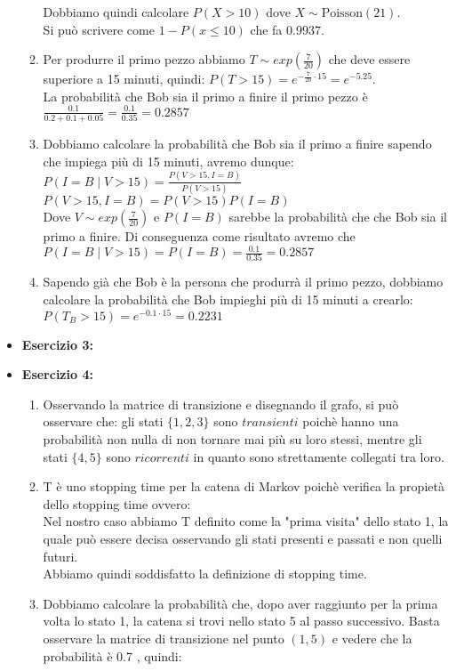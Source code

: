 \documentclass[a4paper,12pt]{article}
\begin{document}
\begin{itemize}
\begin{enumerate}[label=\alph*)]
			Dobbiamo quindi calcolare $P(X > 10)$ dove $X \sim \text{Poisson}(21)$.\\
			Si può scrivere come $1-P(x\leq10)$ che fa 0.9937.\\
			\item Per produrre il primo pezzo abbiamo $T\sim exp(\frac{7}{20})$ che deve essere superiore a 15 minuti, quindi: $P(T > 15)=e^{-\frac{7}{20}\cdot15}=e^{-5.25}.$\\
			La probabilità che Bob sia il primo a finire il primo pezzo è $\frac{0.1}{0.2+0.1+0.05}=\frac{0.1}{0.35}=0.2857$
			\item Dobbiamo calcolare la probabilità che Bob sia il primo a finire sapendo che impiega più di 15 minuti, avremo dunque:\\
			$P(I=B\mid V>15) = \frac{P(V > 15, I = B)}{P(V>15)}$\\
			$P(V > 15, I = B) = P(V > 15)P(I = B)$\\
			Dove $V\sim exp(\frac{7}{20})$ e $P(I=B)$ sarebbe la probabilità che che Bob sia il primo a finire. Di conseguenza come risultato avremo che $P(I=B\mid V>15) =P(I = B)=\frac{0.1}{0.35}=0.2857$
			\item Sapendo già che Bob è la persona che produrrà il primo pezzo, dobbiamo calcolare la probabilità che Bob impieghi più di 15 minuti a crearlo:\\
			$P(T_B>15)=e^{-0.1\cdot15}=0.2231$
		\end{enumerate}
		\item \textbf{Esercizio 3: }
		\item \textbf{Esercizio 4: }
		\begin{enumerate}[label=\alph*)]
			\item Osservando la matrice di transizione e disegnando il grafo, si può osservare che:
			gli stati $\{1,2,3\}$ sono $transienti$ poichè hanno una probabilità non nulla di non tornare mai più su loro stessi, mentre gli stati $\{4,5\}$ sono $ricorrenti$ in quanto sono strettamente collegati tra loro.
			\item T è uno stopping time per la catena di Markov poichè verifica la propietà dello stopping time ovvero:\\
			Nel nostro caso abbiamo T definito come la "prima visita" dello stato 1, la quale può essere decisa osservando gli stati presenti e passati e non quelli futuri.\\
			Abbiamo quindi soddisfatto la definizione di stopping time.
			\item  Dobbiamo calcolare la probabilità che, dopo aver raggiunto per la prima volta lo stato 1, la catena si trovi nello stato 5 al passo successivo. Basta osservare la matrice di transizione nel punto $(1,5)$ e vedere che la probabilità è 0.7 , quindi:\\

\end{enumerate}
\end{itemize}
\end{document}
